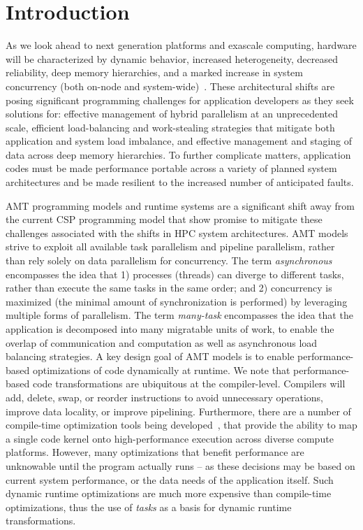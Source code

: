 \chapter{Introduction}
\label{chap:introduction}
As we look ahead to next generation platforms and exascale computing, hardware 
will be characterized by dynamic behavior, increased
heterogeneity, decreased reliability, deep memory hierarchies, and a marked increase in system
\gls{concurrency} (both on-node and system-wide)~\cite{doe_arch, dav_exascale}. 
These architectural shifts are posing significant programming challenges for
application developers as they seek solutions for: effective management of hybrid parallelism 
at an unprecedented scale,  efficient load-balancing and work-stealing
strategies that mitigate both application and system load imbalance, and effective management and
staging of data across deep memory hierarchies.  To further complicate matters,
application codes must be made performance portable across a variety of planned
system architectures and be made resilient to the increased number of anticipated faults.  

\gls{AMT} \glspl{programming model} and \glspl{runtime system} 
are a significant shift away from the current \gls{CSP} programming model that
show promise to mitigate these challenges associated with the shifts in \gls{HPC} system architectures.  
\gls{AMT} models strive to exploit all available \gls{task parallelism} and
\gls{pipeline parallelism}, rather than rely solely on \gls{data parallelism}
for \gls{concurrency}. The term {\em \gls{asynchronous}} encompasses the idea that 
1) processes (threads) can diverge to different tasks, rather than execute 
the same tasks in the same order; and 2) \gls{concurrency} is maximized (the 
  minimal amount of synchronization is performed) by 
leveraging multiple forms of parallelism. The term {\em many-task} encompasses 
the idea that the application is decomposed into many 
\gls{migratable} units of work, to enable the overlap of communication and 
computation as well as asynchronous load balancing strategies.
A key design goal of \gls{AMT} models is to enable performance-based
optimizations of code dynamically at runtime.
We note that performance-based code transformations are ubiquitous at the compiler-level.
Compilers will add, delete, swap, or reorder instructions to avoid unnecessary operations, improve data locality, or improve pipelining.
Furthermore, there are a number of compile-time optimization tools being
developed~\cite{Kokkos,RAJA}, that provide the ability to map a
single code kernel onto high-performance execution across diverse compute platforms.
However, many optimizations that benefit performance are unknowable until the program
actually runs -- as these decisions may be based on current system performance,
or the data needs of the application itself. Such dynamic runtime optimizations are much more expensive 
than compile-time optimizations, thus the use of \emph{tasks} as a basis
for dynamic runtime transformations.

